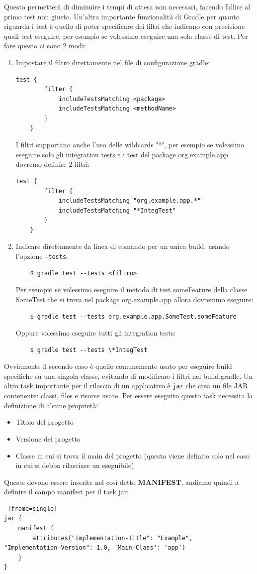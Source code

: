 Questo permetterà di diminuire i tempi di attesa non necessari, facendo fallire al primo test non giusto. Un'altra importante funzionalità di Gradle per quanto riguarda i test è quello di poter specificare dei filtri che indicano con precisione quali test eseguire, per esempio se volessimo eseguire una sola classe di test. Per fare questo ci sono 2 modi:
\begin{enumerate}
    \item Impostare il filtro direttamente nel file di configurazione gradle:
    \begin{lstlisting}[frame=single]
    test {
        filter {
            includeTestsMatching <package>
            includeTestsMatching <methodName>
        }
    }
    \end{lstlisting}
    I filtri supportano anche l'uso delle wildcards "*", per esempio se volessimo eseguire solo gli integration tests e i test del package org.example.app dovremo definire 2 filtri:
    \begin{lstlisting}[frame=single]
    test {
        filter {
            includeTestsMatching "org.example.app.*"
            includeTestsMatching "*IntegTest"
        }
    }
    \end{lstlisting}
    \item Indicare direttamente da linea di comando per un unica build, usando l'opzione \texttt{--tests}:
    \begin{verbatim}
    $ gradle test --tests <filtro> \end{verbatim}
    Per esempio se volessimo eseguire il metodo di test someFeature della classe SomeTest che si trova nel package org.example.app allora dovremmo eseguire:
    \begin{verbatim}
    $ gradle test --tests org.example.app.SomeTest.someFeature \end{verbatim}
    Oppure volessimo eseguire tutti gli integration tests:
    \begin{verbatim}
    $ gradle test --tests \*IntegTest \end{verbatim}
\end{enumerate}
Ovviamente il secondo caso è quello comunemente usato per eseguire build specifiche su una singola classe, evitando di modificare i filtri nel build.gradle. Un altro task importante per il rilascio di un applicativo è \texttt{jar} che crea un file JAR contenente: classi, files e risorse usate. Per essere eseguito questo task necessita la definizione di alcune proprietà:
\begin{itemize}
    \item Titolo del progetto 
    \item Versione del progetto 
    \item Classe in cui si trova il main del progetto (questo viene definito solo nel caso in cui si debba rilasciare un eseguibile) 
\end{itemize}
Queste devono essere inserite nel così detto \textbf{MANIFEST}, andiamo quindi a definire il campo manifest per il task jar:
\begin{lstlisting} [frame=single]
jar {
    manifest {
        attributes("Implementation-Title": "Example",  "Implementation-Version": 1.0, 'Main-Class': 'app')
    }    
}
\end{lstlisting}